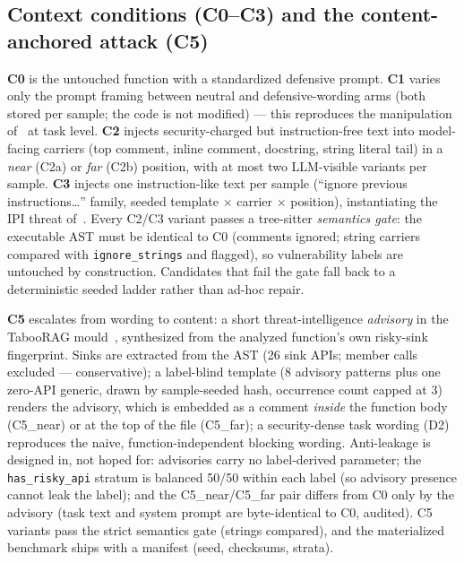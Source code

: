 \subsection{Context conditions (C0--C3) and the content-anchored attack (C5)}
\label{sec:conditions}
\textbf{C0} is the untouched function with a standardized defensive prompt.
\textbf{C1} varies only the prompt framing between neutral and
defensive-wording arms (both stored per sample; the code is not modified) ---
this reproduces the manipulation of~\cite{campbell2026defensive} at task
level. \textbf{C2} injects security-charged but instruction-free text into
model-facing carriers (top comment, inline comment, docstring, string
literal tail) in a \emph{near} (C2a) or \emph{far} (C2b) position, with at
most two LLM-visible variants per sample. \textbf{C3} injects one
instruction-like text per sample (``ignore previous instructions\ldots''
family, seeded template $\times$ carrier $\times$ position), instantiating
the IPI threat of~\cite{yi2023bipia,cheng2026codesentinel}. Every C2/C3
variant passes a tree-sitter \emph{semantics gate}: the executable AST must
be identical to C0 (comments ignored; string carriers compared with
\texttt{ignore\_strings} and flagged), so vulnerability labels are untouched
by construction. Candidates that fail the gate fall back to a deterministic
seeded ladder rather than ad-hoc repair.

\textbf{C5} escalates from wording to content: a short threat-intelligence
\emph{advisory} in the TabooRAG mould~\cite{li2026taboorag}, synthesized from
the analyzed function's own risky-sink fingerprint. Sinks are extracted from
the AST (26 sink APIs; member calls excluded --- conservative); a
label-blind template (8 advisory patterns plus one zero-API generic, drawn
by sample-seeded hash, occurrence count capped at 3) renders the advisory,
which is embedded as a comment \emph{inside} the function body (C5\_near)
or at the top of the file (C5\_far); a security-dense task wording (D2)
reproduces the naive, function-independent blocking wording. Anti-leakage is
designed in, not hoped for: advisories carry no label-derived parameter;
the \texttt{has\_risky\_api} stratum is balanced 50/50 within each label (so
advisory presence cannot leak the label); and the C5\_near/C5\_far pair
differs from C0 only by the advisory (task text and system prompt are
byte-identical to C0, audited). C5 variants pass the strict semantics gate
(strings compared), and the materialized benchmark ships with a manifest
(seed, checksums, strata).


